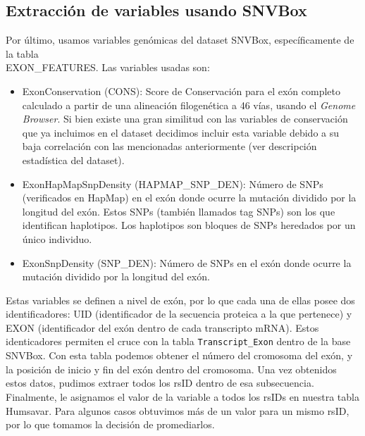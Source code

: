  

\subsection{Extracción de variables usando SNVBox}

Por último, usamos variables genómicas del dataset SNVBox, específicamente de la tabla \\ EXON\_FEATURES. Las variables usadas son:
\begin{itemize}
    \item ExonConservation (CONS): Score de Conservación para el exón completo calculado a partir de una alineación filogenética a 46 vías, usando el \textit{Genome Browser}. Si bien existe una gran similitud con las variables de conservación que ya incluimos en el dataset decidimos incluir esta variable debido a su baja correlación con las mencionadas anteriormente (ver descripción estadística del dataset).
    \item ExonHapMapSnpDensity (HAPMAP\_SNP\_DEN): Número de SNPs (verificados en HapMap) en el exón donde ocurre la mutación dividido por la longitud del exón. Estos SNPs (también llamados tag SNPs) son los que identifican haplotipos. Los haplotipos son bloques de SNPs heredados por un único individuo.
    \item ExonSnpDensity (SNP\_DEN): Número de SNPs en el exón donde ocurre la mutación dividido por la longitud del exón.
\end{itemize}

Estas variables se definen a nivel de exón, por lo que cada una de ellas posee dos identificadores: UID (identificador de la secuencia proteica a la que pertenece) y EXON (identificador del exón dentro de cada transcripto mRNA). Estos identicadores permiten el cruce con la tabla \texttt{Transcript\_Exon} dentro de la base SNVBox. Con esta tabla podemos obtener el número del cromosoma del exón, y la posición de inicio y fin del exón dentro del cromosoma. Una vez obtenidos estos datos, pudimos extraer todos los rsID dentro de esa subsecuencia. Finalmente, le asignamos el valor de la variable a todos los rsIDs en nuestra tabla Humsavar. Para algunos casos obtuvimos más de un valor para un mismo rsID, por lo que tomamos la decisión de promediarlos.


